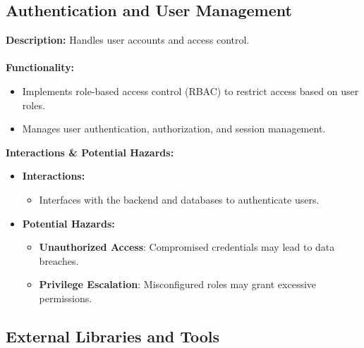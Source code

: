 \documentclass{article}
\begin{document}
\subsection{Authentication and User Management}

\textbf{Description:}
Handles user accounts and access control.
\\\\
\textbf{Functionality:}
\begin{itemize}
    \item Implements role-based access control (RBAC) to restrict access based on user roles.
    \item Manages user authentication, authorization, and session management.
    
\end{itemize}

\textbf{Interactions \& Potential Hazards:}
\begin{itemize}
    \item \textbf{Interactions:}
    \begin{itemize}
        \item Interfaces with the backend and databases to authenticate users.
    \end{itemize}
    \item \textbf{Potential Hazards:}
    \begin{itemize}
        \item \textbf{Unauthorized Access}: Compromised credentials may lead to data breaches.
        \item \textbf{Privilege Escalation}: Misconfigured roles may grant excessive permissions.
    \end{itemize}
\end{itemize}

\subsection{External Libraries and Tools}
\end{document}
